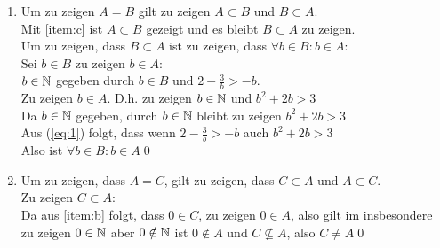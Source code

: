 \documentclass{gadsescript}
\begin{document}
\begin{enumerate}[label=(\alph*)]
	\item Um zu zeigen $ A = B $ gilt zu zeigen $ A \subset B $ und $ B \subset A $.\\
		Mit \ref{item:c} ist $ A \subset B $ gezeigt und es bleibt $ B \subset A $ zu zeigen.\\
		Um zu zeigen, dass $ B \subset A $ ist zu zeigen, dass $ \forall b \in B: b \in A $:\\
		Sei $ b \in B $ zu zeigen $ b \in A $:\\
		$ b \in \mathbb{N} $ gegeben durch $ b \in B $ und $ 2 - \frac{3}{b} > -b $.\\
		Zu zeigen $ b \in A $. D.h. zu zeigen $ b \in \mathbb{N} $ und $ b^2 + 2b > 3 $\\
		Da $ b \in \mathbb{N} $ gegeben, durch $ b \in \mathbb{N} $ bleibt zu zeigen $ b^2 + 2b > 3$\\
		Aus (\ref{eq:1}) folgt, dass wenn $ 2 - \frac{3}{b} > -b $ auch $ b^2 + 2b > 3$\\
		Also ist $ \forall b \in B: b \in A $\qed
	\item Um zu zeigen, dass $ A = C $, gilt zu zeigen, dass $ C \subset A $ und $ A \subset C $.\\
		Zu zeigen $ C \subset A $:\\
		Da aus \ref{item:b} folgt, dass $ 0 \in C $, zu zeigen $ 0 \in A $, also gilt im insbesondere zu zeigen $ 0 \in \mathbb{N} $ aber $ 0 \notin \mathbb{N} $ ist $ 0 \notin A $ und $ C \nsubseteq A $, also $ C \neq A $\qed

\end{enumerate}
\end{document}

